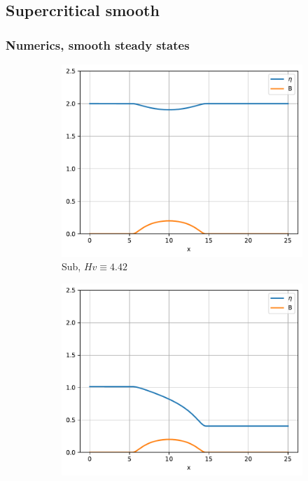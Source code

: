 \documentclass[pt12]{beamer}
\begin{document}
\subsection{Supercritical smooth}
\begin{frame}
\frametitle{Numerics, smooth steady states}

\begin{figure}
     \centering
     \begin{subfigure}[b]{0.30\textwidth}
         \centering
         \includegraphics[width=\textwidth]{figures/smooth_steady/sub/sub.pdf}
         \caption{Sub, $Hv\equiv 4.42$}
         \label{convergence_comp_jumps_sub}
     \end{subfigure}
     \begin{subfigure}[b]{0.30\textwidth}
         \centering
         \includegraphics[width=\textwidth]{figures/smooth_steady/trans/trans.pdf}

\end{subfigure}
\end{figure}
\end{frame}
\end{document}
